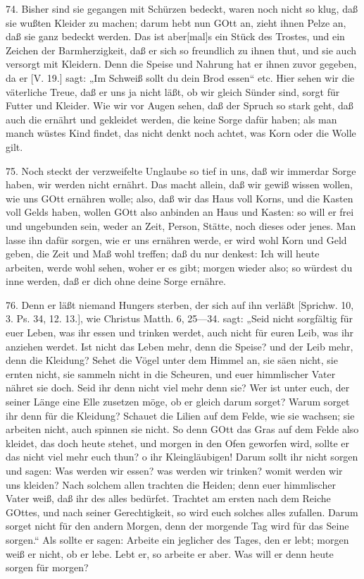 74. Bisher sind sie gegangen mit Schürzen bedeckt, waren noch nicht so klug, daß sie wußten Kleider zu machen; darum hebt nun GOtt an, zieht ihnen Pelze an, daß sie ganz bedeckt werden. Das ist aber[mal]s ein Stück des Trostes, und ein Zeichen der Barmherzigkeit, daß er sich so freundlich zu ihnen thut, und sie auch versorgt mit Kleidern. Denn die Speise und Nahrung hat er ihnen zuvor gegeben, da er [V. 19.] sagt: „Im Schweiß sollt du dein Brod essen“ etc. Hier sehen wir die väterliche Treue, daß er uns ja nicht läßt, ob wir gleich Sünder sind, sorgt für Futter und Kleider. Wie wir vor Augen sehen, daß der Spruch so stark geht, daß auch die ernährt und gekleidet werden, die keine Sorge dafür haben; als man manch wüstes Kind findet, das nicht denkt noch achtet, was Korn oder die Wolle gilt.

75. Noch steckt der verzweifelte Unglaube so tief in uns, daß wir immerdar Sorge haben, wir werden nicht ernährt. Das macht allein,
daß wir gewiß wissen wollen, wie uns GOtt ernähren wolle; also, daß wir das Haus voll Korns, und die Kasten voll Gelds haben, wollen GOtt also anbinden an Haus und Kasten: so will er frei und ungebunden sein, weder an Zeit, Person, Stätte, noch dieses oder jenes. Man lasse ihn dafür sorgen, wie er uns ernähren werde, er wird wohl Korn und Geld geben, die Zeit und Maß wohl treffen; daß du nur denkest: Ich will heute arbeiten, werde wohl sehen, woher er es gibt; morgen wieder also; so würdest du inne werden, daß er dich ohne deine Sorge ernähre.

76. Denn er läßt niemand Hungers sterben, der sich auf ihn verläßt [Sprichw. 10, 3. Ps. 34, 12. 13.], wie Christus Matth. 6, 25—34. sagt: „Seid nicht sorgfältig für euer Leben, was ihr essen und trinken werdet, auch nicht für euren Leib, was ihr anziehen werdet. Ist nicht das Leben mehr, denn die Speise? und der Leib mehr, denn die Kleidung? Sehet die Vögel unter dem Himmel an, sie säen nicht, sie ernten nicht, sie sammeln nicht in die Scheuren, und euer himmlischer Vater nähret sie doch. Seid ihr denn nicht viel mehr denn sie? Wer ist unter euch, der seiner Länge eine Elle zusetzen möge, ob er gleich darum sorget? Warum sorget ihr denn für die Kleidung? Schauet die Lilien auf dem Felde, wie sie wachsen; sie arbeiten nicht, auch spinnen sie nicht. So denn GOtt das Gras auf dem Felde also kleidet, das doch heute stehet, und morgen in den Ofen geworfen wird, sollte er das nicht viel mehr euch thun? o ihr Kleingläubigen! Darum sollt ihr nicht sorgen und sagen: Was werden wir essen? was werden wir trinken? womit werden wir uns kleiden? Nach solchem allen trachten die Heiden; denn euer himmlischer Vater weiß, daß ihr des alles bedürfet. Trachtet am ersten nach dem Reiche GOttes, und nach seiner Gerechtigkeit, so wird euch solches alles zufallen. Darum sorget nicht für den andern Morgen, denn der morgende Tag wird für das Seine sorgen.“ Als sollte er sagen: Arbeite ein jeglicher des Tages, den er lebt; morgen weiß er nicht, ob er lebe. Lebt er, so arbeite er aber. Was will er denn heute sorgen für morgen?

